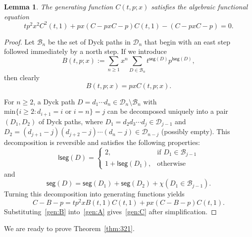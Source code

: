 \documentclass[12pt]{amsart} %
\numberwithin{equation}{section}
\theoremstyle{plain}
\newtheorem{lemma}[theorem]{Lemma}
\theoremstyle{definition}
\def\lseg{\mathsf{lseg}}
\def\seg{\mathsf{seg}}
\def\min{\mathrm{min}}
\begin{document}
\begin{lemma}\label{decom:dyck}
The generating function $C(t,p;x)$ satisfies the algebraic functional equation
\begin{equation}\label{gen:C}
tp^2x^2C^2(t,1)+px(C-pxC-p)C(t,1)-(C-pxC-p)=0.
\end{equation}
\end{lemma}
\begin{proof}
Let $\mathcal{B}_n$ be the set of Dyck paths in $\mathcal{D}_n$ that begin with an east step followed immediately by a north step. If we introduce 
$$
B(t,p;x):=\sum_{n\geq1}x^n\sum_{D\in\mathcal{B}_n}t^{\seg(D)}p^{\lseg(D)},
$$
then clearly 
\begin{equation}\label{gen:B}
B(t,p;x)=pxC(t,p;x).
\end{equation}

For $n\geq2$, a Dyck path $D=d_1\cdots d_n\in\mathcal{D}_n\setminus\mathcal{B}_n$  with $\min\{i\geq2: d_{i+1}=i\text{ or $i=n$}\}=j$ can be decomposed uniquely into a pair $(D_1,D_2)$  of Dyck paths, where $D_1=d_2d_3\cdots d_j\in\mathcal{D}_{j-1}$ and $D_2=(d_{j+1}-j)(d_{j+2}-j)\cdots(d_n-j)\in\mathcal{D}_{n-j}$ (possibly empty). This decomposition is reversible and satisfies the following properties: 
$$
\lseg(D)=
\begin{cases}
2,\quad&\text{if $D_1\in\mathcal{B}_{j-1}$}\\
1+\lseg(D_1), &\text{otherwise}
\end{cases}
$$
and
$$
\seg(D)=\seg(D_1)+\seg(D_2)+\chi(D_1\in\mathcal{B}_{j-1}).
$$
Turning this decomposition into generating functions yields 
\begin{equation}\label{gen:A}
C-B-p=tp^2xB(t,1)C(t,1)+px(C-B-p)C(t,1).
\end{equation}
Substituting~\eqref{gen:B} into~\eqref{gen:A} gives~\eqref{gen:C} after simplification. 
\end{proof}

We are ready to prove Theorem~\ref{thm:321}.
\end{document}
